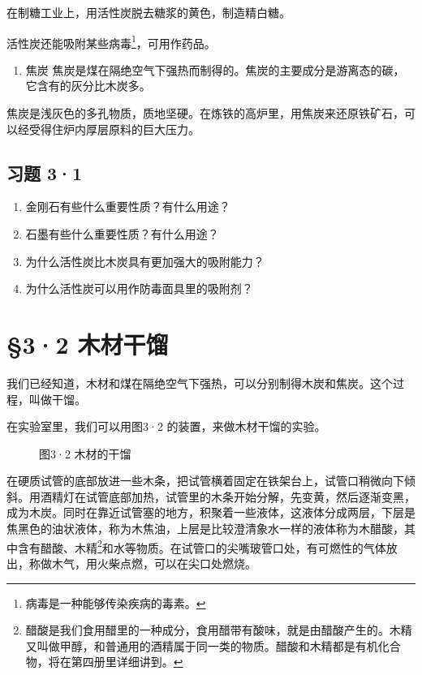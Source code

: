 在制糖工业上，用活性炭脱去糖浆的黄色，制造精白糖。

活性炭还能吸附某些病毒\footnote{病毒是一种能够传染疾病的毒素。}，可用作药品。

\begin{enumerate}[start=3]
\item
  焦炭
  焦炭是煤在隔绝空气下强热而制得的。焦炭的主要成分是游离态的碳，它含有的灰分比木炭多。
\end{enumerate}

焦炭是浅灰色的多孔物质，质地坚硬。在炼铁的高炉里，用焦炭来还原铁矿石，可以经受得住炉内厚层原料的巨大压力。

\subsection{习题 3·1}

\begin{enumerate}
\item
  金刚石有些什么重要性质？有什么用途？
\item
  石墨有些什么重要性质？有什么用途？
\item
  为什么活性炭比木炭具有更加强大的吸附能力？
\item
  为什么活性炭可以用作防毒面具里的吸附剂？
\end{enumerate}

\section{§3·2 木材干馏}

我们已经知道，木材和煤在隔绝空气下强热，可以分别制得木炭和焦炭。这个过程，叫做干馏。

在实验室里，我们可以用图3·2 的装置，来做木材干馏的实验。

\begin{figure}
\centering
\caption{图3·2 木材的干馏}
\end{figure}

在硬质试管的底部放进一些木条，把试管横着固定在铁架台上，试管口稍微向下倾斜。用酒精灯在试管底部加热，试管里的木条开始分解，先变黄，然后逐渐变黑，成为木炭。同时在靠近试管塞的地方，积聚着一些液体，这液体分成两层，下层是焦黑色的油状液体，称为木焦油，上层是比较澄清象水一样的液体称为木醋酸，其中含有醋酸、木精\footnote{醋酸是我们食用醋里的一种成分，食用醋带有酸味，就是由醋酸产生的。木精又叫做甲醇，和普通用的酒精属于同一类的物质。醋酸和木精都是有机化合物，将在第四册里详细讲到。}和水等物质。在试管口的尖嘴玻管口处，有可燃性的气体放出，称做木气，用火柴点燃，可以在尖口处燃烧。

